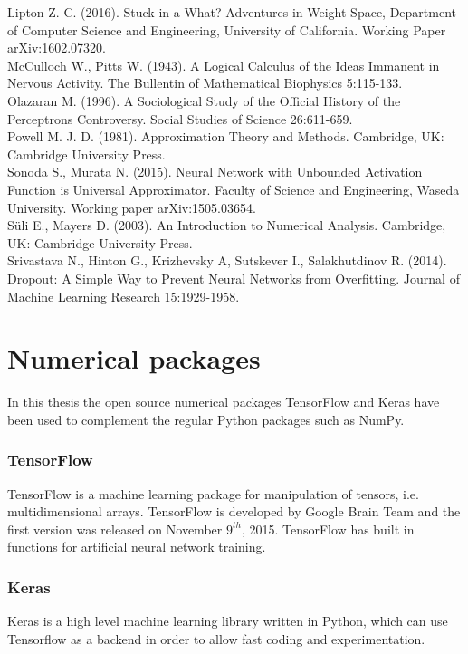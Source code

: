 \documentclass[11pt, letterpaper]{amsart}
\begin{document}
Lipton Z. C. (2016). Stuck in a What? Adventures in Weight Space, Department of Computer Science and Engineering, University of California. Working Paper arXiv:1602.07320.
\\

McCulloch W., Pitts W. (1943). A Logical Calculus of the Ideas Immanent in Nervous Activity. The Bullentin of Mathematical Biophysics 5:115-133.
\\

Olazaran M. (1996). A Sociological Study of the Official History of the Perceptrons Controversy. Social Studies of Science 26:611-659.
\\

Powell M. J. D. (1981). Approximation Theory and Methods. Cambridge, UK: Cambridge University Press.
\\

Sonoda S., Murata N. (2015). Neural Network with Unbounded Activation Function is Universal Approximator. Faculty of Science and Engineering, Waseda University. Working paper arXiv:1505.03654.
\\

Süli E., Mayers D. (2003). An Introduction to Numerical Analysis. Cambridge, UK: Cambridge University Press.
\\

Srivastava N., Hinton G., Krizhevsky A, Sutskever I., Salakhutdinov R. (2014). Dropout:  A Simple Way to Prevent Neural Networks from
Overfitting. Journal of Machine Learning Research 15:1929-1958.

\newpage

\appendix

\section{Numerical packages}
In this thesis the open source numerical packages TensorFlow and Keras have been used to complement the regular Python packages such as NumPy.

\subsubsection{TensorFlow}
TensorFlow is a machine learning package for manipulation of tensors, i.e. multidimensional arrays. TensorFlow is developed by Google Brain Team and the first version was released on November $9^{th}$, 2015. TensorFlow has built in functions for artificial neural network training.

\subsubsection{Keras}
Keras is a high level machine learning library written in Python, which can use Tensorflow as a backend in order to allow fast coding and experimentation.
\end{document}
